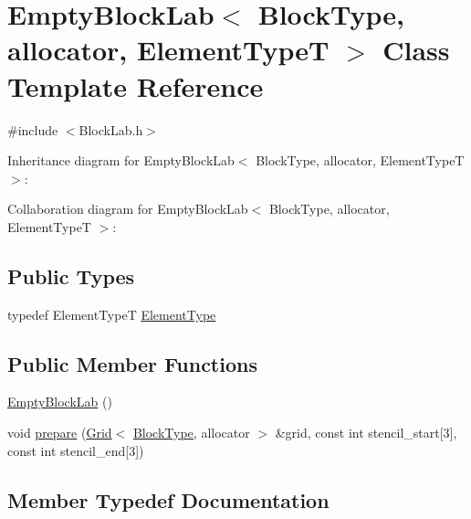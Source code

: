 \hypertarget{class_empty_block_lab}{}\section{Empty\+Block\+Lab$<$ Block\+Type, allocator, Element\+Type\+T $>$ Class Template Reference}
\label{class_empty_block_lab}


{\ttfamily \#include $<$Block\+Lab.\+h$>$}



Inheritance diagram for Empty\+Block\+Lab$<$ Block\+Type, allocator, Element\+Type\+T $>$\+:


Collaboration diagram for Empty\+Block\+Lab$<$ Block\+Type, allocator, Element\+Type\+T $>$\+:
\subsection*{Public Types}
\begin{DoxyCompactItemize}
\item 
typedef Element\+Type\+T \hyperlink{class_empty_block_lab_a090310d2af6fb159b6fe949413cbd47a}{Element\+Type}
\end{DoxyCompactItemize}
\subsection*{Public Member Functions}
\begin{DoxyCompactItemize}
\item 
\hyperlink{class_empty_block_lab_a8311d174957e8254a665b5b23c38e844}{Empty\+Block\+Lab} ()
\item 
void \hyperlink{class_empty_block_lab_acc1e6ead590c67446bee384eb3a3ec49}{prepare} (\hyperlink{class_grid}{Grid}$<$ \hyperlink{class_block_lab_a745b3c9ac17f6743d11a7085196981a0}{Block\+Type}, allocator $>$ \&grid, const int stencil\+\_\+start\mbox{[}3\mbox{]}, const int stencil\+\_\+end\mbox{[}3\mbox{]})
\end{DoxyCompactItemize}


\subsection{Member Typedef Documentation}
\hypertarget{class_empty_block_lab_a090310d2af6fb159b6fe949413cbd47a}{}
